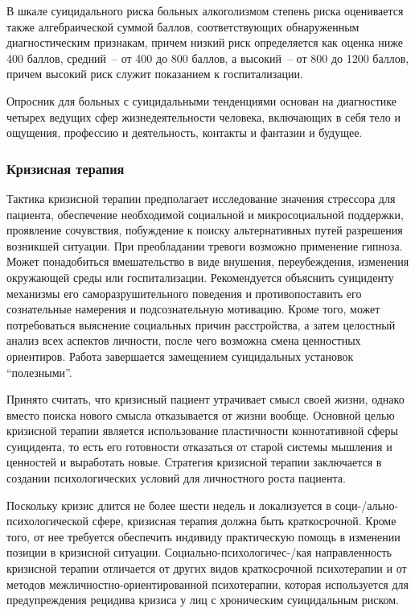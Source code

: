 В шкале суицидального риска больных алкоголизмом степень риска оценивается также алгебраической суммой баллов, соответствующих обнаруженным диагностическим признакам, причем низкий риск определяется как оценка ниже 400 баллов, средний~-- от 400 до 800 баллов, а высокий~-- от 800 до 1200 баллов, причем высокий риск служит показанием к госпитализации.~\cite{starsen}

Опросник для больных с суицидальными тенденциями основан на диагностике четырех ведущих сфер жизнедеятельности человека, включающих в себя тело и ощущения, профессию и деятельность, контакты и фантазии и будущее.~\cite{starsen}

\subsubsection{Кризисная терапия}

Тактика кризисной терапии предполагает исследование значения стрессора для пациента, обеспечение необходимой социальной и микросоциальной поддержки, проявление сочувствия, побуждение к поиску альтернативных путей разрешения возникшей ситуации. При преобладании тревоги возможно применение гипноза. Может понадобиться вмешательство в виде внушения, переубеждения, изменения окружающей среды или госпитализации. Рекомендуется объяснить суициденту механизмы его саморазрушительного поведения и противопоставить его сознательные намерения и подсознательную мотивацию. Кроме того, может потребоваться выяснение социальных причин расстройства, а затем целостный анализ всех аспектов личности, после чего возможна смена ценностных ориентиров. Работа завершается замещением суицидальных установок ``полезными''.~\cite{starsen}

Принято считать, что кризисный пациент утрачивает смысл своей жизни, однако вместо поиска нового смысла отказывается от жизни вообще. Основной целью кризисной терапии является использование пластичности коннотативной сферы суицидента, то есть его готовности отказаться от старой системы мышления и ценностей и выработать новые. Стратегия кризисной терапии заключается в создании психологических условий для личностного роста пациента.~\cite{starsen}

Поскольку кризис длится не более шести недель и локализуется в соци-/ально-психологической сфере, кризисная терапия должна быть краткосрочной. Кроме того, от нее требуется обеспечить индивиду практическую помощь в изменении позиции в кризисной ситуации. Социально-психологичес-/кая направленность кризисной терапии отличается от других видов краткосрочной психотерапии и от методов межличностно-ориентированной психотерапии, которая используется для предупреждения рецидива кризиса у лиц с хроническим суицидальным риском.~\cite{starsen}


